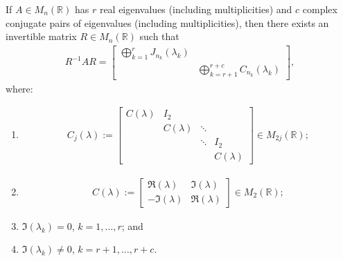 \documentclass[10pt,twoside,leqno]{siamltex}
\begin{document}
\begin{theorem} \label{thm:rjcf} 
If $A \in {M_{{n}}({{\mathbb{{R}}}})}$ has $r$ real eigenvalues (including multiplicities) and $c$ complex conjugate pairs of eigenvalues (including multiplicities), then there exists an invertible matrix $R \in {M_{{n}}({{\mathbb{{R}}}})}$ such that 
\begin{align}
{{R}^{-1}} A R =
\begin{bmatrix} 
\bigoplus_{k=1}^{r} J_{n_k} (\lambda_k) & \\ & \bigoplus_{k = r + 1}^{r + c} C_{n_k} (\lambda_k)  
\end{bmatrix},															\label{realjordform}	
\end{align}
where:
\begin{enumerate}
\item
\begin{align}
C_{j} (\lambda) := 
\begin{bmatrix} 
C(\lambda) 	& I_2                        			\\
            	& C(\lambda) & \ddots 			\\
            	&                    & \ddots & I_2 		\\ 
            	&                    &            & C(\lambda) 
\end{bmatrix} \in {M_{{2j}}({{\mathbb{{R}}}})}; 												\label{Ck_lambda} 	
\end{align}
\item
\begin{align} 
C(\lambda) := 
\begin{bmatrix} 
\Re{(\lambda)} & \Im{(\lambda)} \\ 
-\Im{(\lambda)} & \Re{(\lambda)}  
\end{bmatrix} \in {M_{{2}}({{\mathbb{{R}}}})}; 												\label{C_lambda}	
\end{align}
\item $\Im{(\lambda_k)} = 0$, $k=1, \dots, r$; and 
\item $\Im{(\lambda_k)} \neq 0$, $k=r+1, \dots, r+c$.
\end{enumerate}
\end{theorem}
\end{document}
